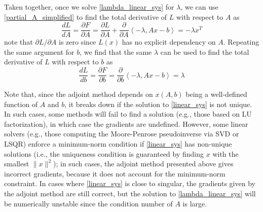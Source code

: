 \documentclass[11pt, a4paper]{article}
\begin{document}
Taken together, once we solve \eqref{lambda_linear_sys} for $\lambda$, we can use \eqref{partial_A_simplified} to find the total derivative of $L$ with respect to $A$ as
\begin{equation}
    \frac{dL}{dA} = \frac{\partial F}{\partial A} = \frac{\partial L}{\partial A} + \frac{\partial}{\partial A}\left<-\lambda, Ax-b\right> = -\lambda x^T
\end{equation}
note that $\partial L/\partial A$ is zero since $L(x)$ has no explicit dependency on $A$. Repeating the same argument for $b$, we find that the same $\lambda$ can be used to find the total derivative of $L$ with respect to $b$ as
\begin{equation}
    \frac{dL}{db} = \frac{\partial F}{\partial b} = \frac{\partial}{\partial b}\left<-\lambda, Ax-b\right> = \lambda
\end{equation}

Note that, since the adjoint method depends on $x(A, b)$ being a well-defined function of $A$ and $b$, it breaks down if the solution to \eqref{linear_sys} is not unique. In such cases, some methods will fail to find a solution (e.g., those based on LU factorization), in which case the gradients are undefined. However, some linear solvers (e.g., those computing the Moore-Penrose pseudoinverse via SVD or LSQR) enforce a minimum-norm condition if \eqref{linear_sys} has non-unique solutions (i.e., the uniqueness condition is guaranteed by finding $x$ with the smallest $\|x\|^2$); in such cases, the adjoint method presented above gives incorrect gradients, because it does not account for the minimum-norm constraint. In cases where \eqref{linear_sys} is close to singular, the gradients given by the adjoint method are still correct, but the solution to \eqref{lambda_linear_sys} will be numerically unstable since the condition number of $A$ is large.
\end{document}
